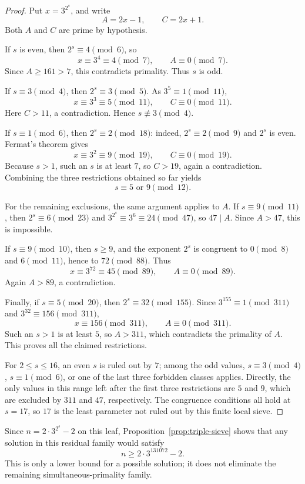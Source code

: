 \documentclass[11pt]{article}
\begin{document}
\begin{proof}
Put \(x=3^{2^s}\), and write
\[
A=2x-1,\qquad C=2x+1.
\]
Both \(A\) and \(C\) are prime by hypothesis.

If \(s\) is even, then \(2^s\equiv4\pmod6\), so
\[
x\equiv3^4\equiv4\pmod7,
\qquad
A\equiv0\pmod7.
\]
Since \(A\geq161>7\), this contradicts primality.  Thus \(s\) is odd.

If \(s\equiv3\pmod4\), then \(2^s\equiv3\pmod5\).  As \(3^5\equiv1\pmod{11}\),
\[
x\equiv3^3\equiv5\pmod{11},
\qquad
C\equiv0\pmod{11}.
\]
Here \(C>11\), a contradiction.  Hence \(s\not\equiv3\pmod4\).

If \(s\equiv1\pmod6\), then \(2^s\equiv2\pmod{18}\): indeed,
\(2^s\equiv2\pmod9\) and \(2^s\) is even.  Fermat's theorem gives
\[
x\equiv3^2\equiv9\pmod{19},
\qquad
C\equiv0\pmod{19}.
\]
Because \(s>1\), such an \(s\) is at least \(7\), so \(C>19\), again a
contradiction.  Combining the three restrictions obtained so far yields
\[
s\equiv5\text{ or }9\pmod{12}.
\]

For the remaining exclusions, the same argument applies to \(A\).
If \(s\equiv9\pmod{11}\), then \(2^s\equiv6\pmod{23}\) and
\(3^{2^s}\equiv3^6\equiv24\pmod{47}\), so \(47\mid A\).  Since \(A>47\),
this is impossible.

If \(s\equiv9\pmod{10}\), then \(s\geq9\), and the exponent \(2^s\) is
congruent to \(0\pmod8\) and \(6\pmod{11}\), hence to \(72\pmod{88}\).
Thus
\[
x\equiv3^{72}\equiv45\pmod{89},
\qquad
A\equiv0\pmod{89}.
\]
Again \(A>89\), a contradiction.

Finally, if \(s\equiv5\pmod{20}\), then \(2^s\equiv32\pmod{155}\).
Since \(3^{155}\equiv1\pmod{311}\) and \(3^{32}\equiv156\pmod{311}\),
\[
x\equiv156\pmod{311},
\qquad
A\equiv0\pmod{311}.
\]
Such an \(s>1\) is at least \(5\), so \(A>311\), which contradicts the
primality of \(A\).  This proves all the claimed restrictions.

For \(2\leq s\leq16\), an even \(s\) is ruled out by \(7\); among the odd
values, \(s\equiv3\pmod4\), \(s\equiv1\pmod6\), or one of the last three
forbidden classes applies.  Directly, the only values in this range left
after the first three restrictions are \(5\) and \(9\), which are excluded
by \(311\) and \(47\), respectively.  The congruence conditions all hold at
\(s=17\), so \(17\) is the least parameter not ruled out by this finite
local sieve.
\end{proof}

Since \(n=2\cdot3^{2^s}-2\) on this leaf, Proposition~\ref{prop:triple-sieve}
shows that any solution in this residual family would satisfy
\[
n\geq2\cdot3^{131072}-2.
\]
This is only a lower bound for a possible solution; it does not eliminate the
remaining simultaneous-primality family.
\end{document}
